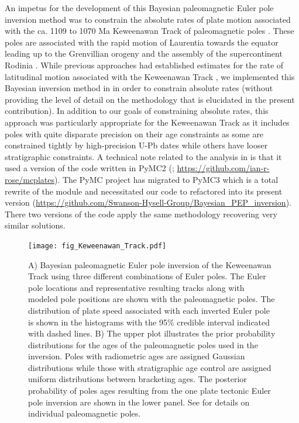 \documentclass[11pt,letterpaper]{article}
\begin{document}
An impetus for the development of this Bayesian paleomagnetic Euler pole inversion method was to constrain the absolute rates of plate motion associated with the ca. 1109 to 1070 Ma Keweenawan Track of paleomagnetic poles \citep{Swanson-Hysell2009a, Swanson-Hysell2019a}. These poles are associated with the rapid motion of Laurentia towards the equator leading up to the Grenvillian orogeny and the assembly of the supercontinent Rodinia \citep{Swanson-Hysell2021a}. While previous approaches had established estimates for the rate of latitudinal motion associated with the Keweenawan Track \citep{Davis1997a, Swanson-Hysell2014b}, we implemented this Bayesian inversion method in \cite{Swanson-Hysell2019a} in order to constrain absolute rates (without providing the level of detail on the methodology that is elucidated in the present contribution). In addition to our goals of constraining absolute rates, this approach was particularly appropriate for the Keweenawan Track as it includes poles with quite disparate precision on their age constraints as some are constrained tightly by high-precision U-Pb dates \citep[e.g.][]{Fairchild2017a} while others have looser stratigraphic constraints. A technical note related to the analysis in \cite{Swanson-Hysell2019a} is that it used a version of the code written in PyMC2 (\citealp{Patil2010a}; \url{https://github.com/ian-r-rose/mcplates}). The PyMC project has migrated to PyMC3 which is a total rewrite of the module \citep{Salvatier2016a} and necessitated our code to refactored into its present version (\url{https://github.com/Swanson-Hysell-Group/Bayesian_PEP_inversion}). There two versions of the code apply the same methodology recovering very similar solutions.

\begin{figure}
\centering
\texttt{[image: fig\_Keweenawan\_Track.pdf]}
\caption{A) Bayesian paleomagnetic Euler pole inversion of the Keweenawan Track using three different combinations of Euler poles. The Euler pole locations and representative resulting tracks along with modeled pole positions are shown with the paleomagnetic poles. The distribution of plate speed associated with each inverted Euler pole is shown in the histograms with the 95$\%$ credible interval indicated with dashed lines. B) The upper plot illustrates the prior probability distributions for the ages of the paleomagnetic poles used in the inversion. Poles with radiometric ages are assigned Gaussian distributions while those with stratigraphic age control are assigned uniform distributions between bracketing ages. The posterior probability of poles ages resulting from the one plate tectonic Euler pole inversion are shown in the lower panel. See \cite{Swanson-Hysell2019a} for details on individual paleomagnetic poles.}
\label{fig:Keweenawan_Track}
\end{figure}
\end{document}
